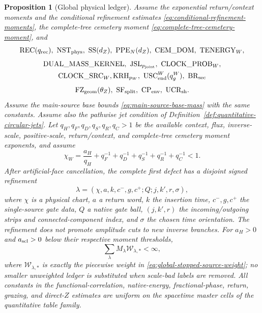\documentclass[11pt]{article}
\newtheorem{proposition}[theorem]{Proposition}
\begin{document}
\begin{proposition}[Global physical ledger]
\label{prop:global-labelled-ledger}
Assume the exponential return/context moments and the conditional refinement
estimates \eqref{eq:conditional-refinement-moments},
the complete-tree cemetery moment
\eqref{eq:complete-tree-cemetery-moment}, and
\[
 \mathrm{REC}(q_{\rm rec}),\ \mathrm{NST}_{\rm phys},\ \mathrm{SS}(d_Z),\
 \mathrm{PPE}_{N}(d_Z),\ \mathrm{CEM\_DOM},\ \mathrm{TENERGY}_{W},
\]
\[
 \begin{gathered}
 \mathrm{DUAL\_MASS\_KERNEL},\ \mathrm{JSL}_{p_{\rm joint}},
 \ \mathrm{CLOCK\_PROB}_{W},\\
 \mathrm{CLOCK\_SRC}_{W},
 \mathrm{KRH}_{p_W},\ \mathrm{USC}_{\rm end}^{W}(q_g^W),\
 \mathrm{BR}_{\rm sec}
 \end{gathered}
\]
\[
 \mathrm{FZ}_{\rm geom}(\theta_Z),\ \mathrm{SF}_{\rm split},\
 \mathrm{CP}_{\rm env},\ \mathrm{UCR}_{\rm sh}.
\]
Assume the main-source base bounds \eqref{eq:main-source-base-mass} with the
same constants.
Assume also the pathwise jet condition of
Definition~\ref{def:quantitative-circular-jets}.  Let
$q_H,q_F,q_D,q_S,q_R,q_C>1$ be the available context, flux, inverse-scale,
positive-scale, return/context, and complete-tree cemetery moment exponents,
and assume
\begin{equation}
\label{eq:holder-conjugate-margin}
 \chi_W=\frac{a_H}{q_H}+q_F^{-1}+q_D^{-1}+q_S^{-1}+q_R^{-1}
        +q_C^{-1}<1.
\end{equation}
After artificial-face cancellation, the complete first defect has a disjoint
signed refinement
\begin{equation}
\label{eq:global-label}
 \lambda=(\chi,a,k,c^-,g,c^+;Q;j,k',r,\sigma),
\end{equation}
where $\chi$ is a physical chart, $a$ a return word, $k$ the insertion time,
$c^-,g,c^+$ the single-source gate data, $Q$ a native gate ball,
$(j,k',r)$ the incoming/outgoing strips and connected-component index, and
$\sigma$ the chosen time orientation.  The refinement does not promote
amplitude cuts to new inverse branches.  For $a_H>0$ and $a_{\rm scl}>0$
below their respective moment thresholds,
\begin{equation}
\label{eq:global-ledger-sum}
 \sum_\lambda M_\lambda\mathscr W_{\lambda,*}<\infty,
\end{equation}
where $\mathscr W_{\lambda,*}$ is exactly the piecewise weight in
\eqref{eq:global-stopped-source-weight}; no smaller unweighted ledger is substituted
when scale-bad labels are removed.
All constants in the functional-correlation, native-energy,
fractional-phase, return, grazing, and direct-$Z$ estimates are uniform on
the spacetime master cells of the quantitative table family.
\end{proposition}
\end{document}
